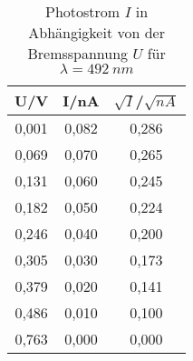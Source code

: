 \begin{table}[h!]
  \centering
  \caption{Photostrom $I$ in Abhängigkeit von der Bremsspannung $U$ für $\lambda=\SI{492}{nm}$}
  \label{tab:g492}
  \begin{tabular}{c c c}
    \toprule
      U/V & I/nA  & $\sqrt{I}$/$\sqrt{nA}$ \\
    \midrule
      0,001 & 0,082 & 0,286 \\
      0,069 & 0,070 & 0,265 \\
      0,131 & 0,060 & 0,245 \\
      0,182 & 0,050 & 0,224 \\
      0,246 & 0,040 & 0,200 \\
      0,305 & 0,030 & 0,173 \\
      0,379 & 0,020 & 0,141 \\
      0,486 & 0,010 & 0,100 \\
      0,763 & 0,000 & 0,000 \\


    \bottomrule
  \end{tabular}
\end{table}
